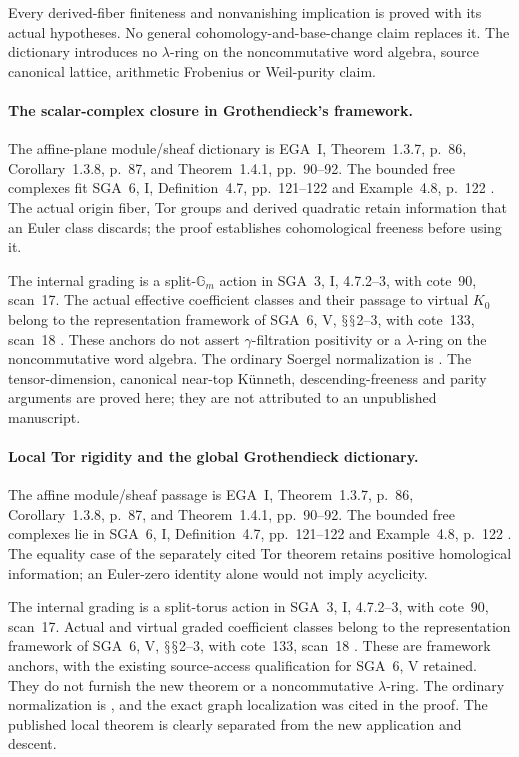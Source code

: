 \documentclass[11pt,a4paper]{article}
\renewcommand{\S}{\ensuremath{\mathsection}}
\theoremstyle{named}\newtheorem{finding}{Finding}[section]
\theoremstyle{definition}\newtheorem{definition}[finding]{Definition}
\theoremstyle{remark}\newtheorem{remark}[finding]{Remark}
\begin{document}
Every derived-fiber finiteness and nonvanishing
implication is proved with its actual hypotheses.
No general cohomology-and-base-change claim replaces
it. The dictionary introduces no \(\lambda\)-ring on
the noncommutative word algebra, source canonical
lattice, arithmetic Frobenius or Weil-purity claim.

\paragraph{The scalar-complex closure in Grothendieck's framework.}
The affine-plane module/sheaf dictionary is EGA~I,
Theorem~1.3.7, p.~86, Corollary~1.3.8, p.~87,
and Theorem~1.4.1, pp.~90--92.
The bounded free complexes fit SGA~6, I,
Definition~4.7, pp.~121--122 and Example~4.8, p.~122
\cite{EGA,SGA6}. The actual origin fiber, Tor groups
and derived quadratic retain information that an
Euler class discards; the proof establishes cohomological
freeness before using it.

The internal grading is a split-\(\mathbb G_m\) action
in SGA~3, I, 4.7.2--3, with cote~90, scan~17.
The actual effective coefficient classes and their
passage to virtual \(K_0\) belong to the representation
framework of SGA~6, V, \S\S2--3, with cote~133, scan~18
\cite{SGA3,SGA6,Archive}. These anchors do not assert
\(\gamma\)-filtration positivity or a \(\lambda\)-ring
on the noncommutative word algebra.
The ordinary Soergel normalization is
\cite[\S3.3, p.~1105; \S3.4, pp.~1106--1107;
\S3.5, Theorem~3.5]{EW}.
The tensor-dimension, canonical near-top K\"unneth,
descending-freeness and parity arguments are proved
here; they are not attributed to an unpublished manuscript.

\paragraph{Local Tor rigidity and the global Grothendieck dictionary.}
The affine module/sheaf passage is EGA~I,
Theorem~1.3.7, p.~86, Corollary~1.3.8, p.~87,
and Theorem~1.4.1, pp.~90--92.
The bounded free complexes lie in SGA~6, I,
Definition~4.7, pp.~121--122 and Example~4.8, p.~122
\cite{EGA,SGA6}. The equality case of the separately
cited Tor theorem retains positive homological
information; an Euler-zero identity alone would
not imply acyclicity.

The internal grading is a split-torus action in
SGA~3, I, 4.7.2--3, with cote~90, scan~17.
Actual and virtual graded coefficient classes belong
to the representation framework of SGA~6, V,
\S\S2--3, with cote~133, scan~18
\cite{SGA3,SGA6,Archive}.
These are framework anchors, with the existing
source-access qualification for SGA~6, V retained.
They do not furnish the new theorem or a
noncommutative \(\lambda\)-ring.
The ordinary normalization is
\cite[\S\S3.3--3.5]{EW}, and the exact graph
localization was cited in the proof.
The published local theorem is clearly separated
from the new application and descent.
\end{document}
